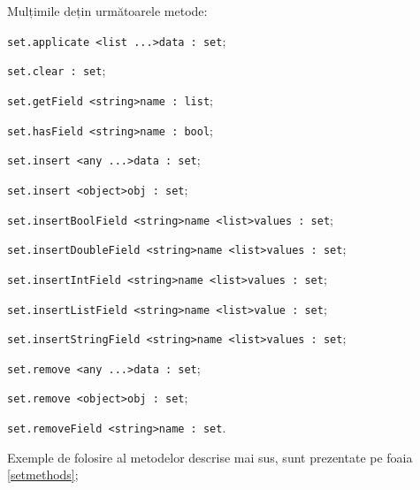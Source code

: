 Mulțimile dețin următoarele metode:
\begin{icItems}
\item \lstinline|set.applicate <list ...>data : set|;
\item \lstinline|set.clear : set|;
\item \lstinline|set.getField <string>name : list|;
\item \lstinline|set.hasField <string>name : bool|;
\item \lstinline|set.insert <any ...>data : set|;
\item \lstinline|set.insert <object>obj : set|;
\item \lstinline|set.insertBoolField <string>name <list>values : set|;
\item \lstinline|set.insertDoubleField <string>name <list>values : set|;
\item \lstinline|set.insertIntField <string>name <list>values : set|;
\item \lstinline|set.insertListField <string>name <list>value : set|;
\item \lstinline|set.insertStringField <string>name <list>values : set|;
\item \lstinline|set.remove <any ...>data : set|;
\item \lstinline|set.remove <object>obj : set|;
\item \lstinline|set.removeField <string>name : set|.
\end{icItems}

Exemple de folosire al metodelor descrise mai sus, sunt prezentate pe foaia \ref{setmethods};

